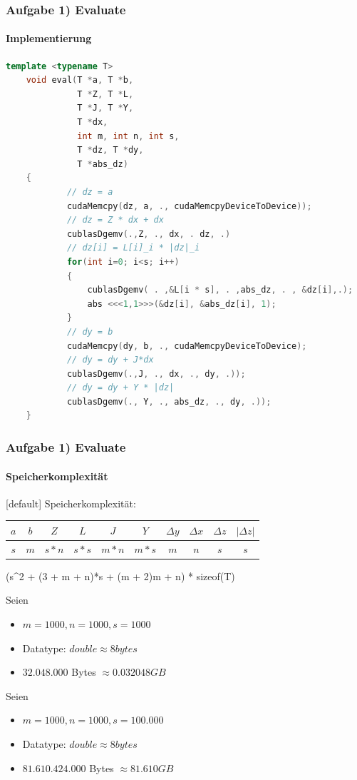 \begin{frame}[fragile]
	\frametitle{Aufgabe 1) Evaluate}
	\framesubtitle{Implementierung}
	\begin{lstlisting}[language=cpp]
	template <typename T>
	void eval(T *a, T *b, 
			  T *Z, T *L, 
			  T *J, T *Y,
			  T *dx,
			  int m, int n, int s,
			  T *dz, T *dy,
			  T *abs_dz)
	{
			// dz = a
			cudaMemcpy(dz, a, ., cudaMemcpyDeviceToDevice));
			// dz = Z * dx + dx
			cublasDgemv(.,Z, ., dx, . dz, .)
			// dz[i] = L[i]_i * |dz|_i
			for(int i=0; i<s; i++)
			{
				cublasDgemv( . ,&L[i * s], . ,abs_dz, . , &dz[i],.);
				abs <<<1,1>>>(&dz[i], &abs_dz[i], 1);
			}
			// dy = b
			cudaMemcpy(dy, b, ., cudaMemcpyDeviceToDevice);
			// dy = dy + J*dx
			cublasDgemv(.,J, ., dx, ., dy, .));
			// dy = dy + Y * |dz|
			cublasDgemv(., Y, ., abs_dz, ., dy, .));
	}
	\end{lstlisting}
\end{frame}
\begin{frame}
	\frametitle{Aufgabe 1) Evaluate}
	\framesubtitle{Speicherkomplexität}
	[default]
	Speicherkomplexität: \\
	\begin{center}
		\begin{tabular}{ c | c | c | c | c | c | c | c | c | c }
		$a$ & $b$ & $Z$ & $L$ & $J$ & $Y$ & $\Delta y$ & $\Delta x$ & $\Delta z$ & $|\Delta z|$\\
		\hline
		$s$ & $m$ & $s*n$ & $s*s$ & $m*n$ & $m*s$ & $m$ & $n$ & $s$& $s$\\
		\end{tabular}
	\end{center}
	\begin{flalign*}
		(s^2 + (3 + m + n)*s + (m + 2)m + n) * sizeof(T)
	\end{flalign*}
	Seien 
	\begin{itemize}
		\item $m = 1000, n = 1000, s=1000$
		\item Datatype: $double \approx 8 bytes$
		\item $32.048.000$ Bytes $\approx 0.032048 GB$
	\end{itemize}
	Seien 
	\begin{itemize}
		\item $m = 1000, n = 1000, s=100.000$
		\item Datatype: $double \approx 8 bytes$
		\item $81.610.424.000$ Bytes $\approx 81.610 GB$
		\end{itemize}
\end{frame}
